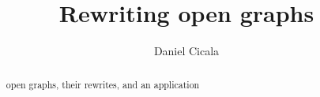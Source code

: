 \documentclass{amsart}
\begin{document}

\begin{abstract}
	open graphs, 
	their rewrites, 
	and an application
\end{abstract}	

\title{Rewriting open graphs}
\author{Daniel Cicala}
\maketitle


% 
%
	
	


	
\end{document}
